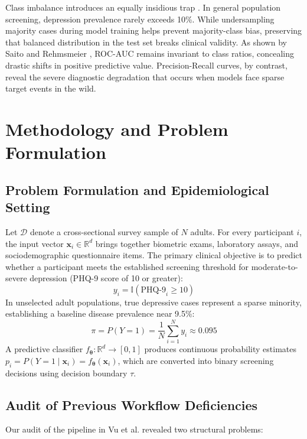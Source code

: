 \documentclass[conference]{IEEEtran}
\begin{document}
Class imbalance introduces an equally insidious trap \cite{he2009}. In general population screening, depression prevalence rarely exceeds 10\%. While undersampling majority cases during model training helps prevent majority-class bias, preserving that balanced distribution in the test set breaks clinical validity. As shown by Saito and Rehmsmeier \cite{saito2015}, ROC-AUC remains invariant to class ratios, concealing drastic shifts in positive predictive value. Precision-Recall curves, by contrast, reveal the severe diagnostic degradation that occurs when models face sparse target events in the wild.

\section{Methodology and Problem Formulation}

\subsection{Problem Formulation and Epidemiological Setting}
Let $\mathcal{D}$ denote a cross-sectional survey sample of $N$ adults. For every participant $i$, the input vector $\mathbf{x}_i \in \mathbb{R}^d$ brings together biometric exams, laboratory assays, and sociodemographic questionnaire items. The primary clinical objective is to predict whether a participant meets the established screening threshold for moderate-to-severe depression (PHQ-9 score of 10 or greater):
\begin{equation}
y_i = \mathbb{I}(\text{PHQ-9}_i \ge 10)
\end{equation}
In unselected adult populations, true depressive cases represent a sparse minority, establishing a baseline disease prevalence near 9.5\%:
\begin{equation}
\pi = P(Y=1) = \frac{1}{N}\sum_{i=1}^N y_i \approx 0.095
\end{equation}
A predictive classifier $f_{\boldsymbol{\theta}}: \mathbb{R}^d \to [0, 1]$ produces continuous probability estimates $p_i = P(Y=1 \mid \mathbf{x}_i) = f_{\boldsymbol{\theta}}(\mathbf{x}_i)$, which are converted into binary screening decisions using decision boundary $\tau$.

\subsection{Audit of Previous Workflow Deficiencies}
Our audit of the pipeline in Vu et al. \cite{vu2025} revealed two structural problems:
\end{document}
